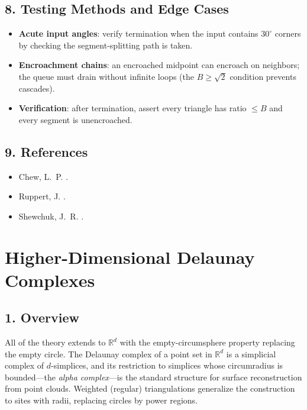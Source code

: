 \subsection{8. Testing Methods and Edge Cases}

\begin{itemize}
\item \textbf{Acute input angles}: verify termination when the input contains
  $30^\circ$ corners by checking the segment-splitting path is taken.
\item \textbf{Encroachment chains}: an encroached midpoint can encroach on
  neighbors; the queue must drain without infinite loops (the $B \ge \sqrt{2}$
  condition prevents cascades).
\item \textbf{Verification}: after termination, assert every triangle has ratio
  $\le B$ and every segment is unencroached.
\end{itemize}

\subsection{9. References}

\begin{itemize}
\item Chew, L.~P. \cite{chew1989}.
\item Ruppert, J. \cite{ruppert1995}.
\item Shewchuk, J.~R. \cite{shewchuk1998}.
\end{itemize}

\section{Higher-Dimensional Delaunay Complexes}
\label{sec:delaunay_higher_dimensional}

\subsection{1. Overview}

All of the theory extends to $\mathbb{R}^d$ with the empty-circumsphere
property replacing the empty circle. The Delaunay complex of a point set in
$\mathbb{R}^d$ is a simplicial complex of $d$-simplices, and its restriction
to simplices whose circumradius is bounded---the \emph{alpha
complex}---is the standard structure for surface reconstruction from point
clouds. Weighted (regular) triangulations generalize the construction to sites
with radii, replacing circles by power regions.

